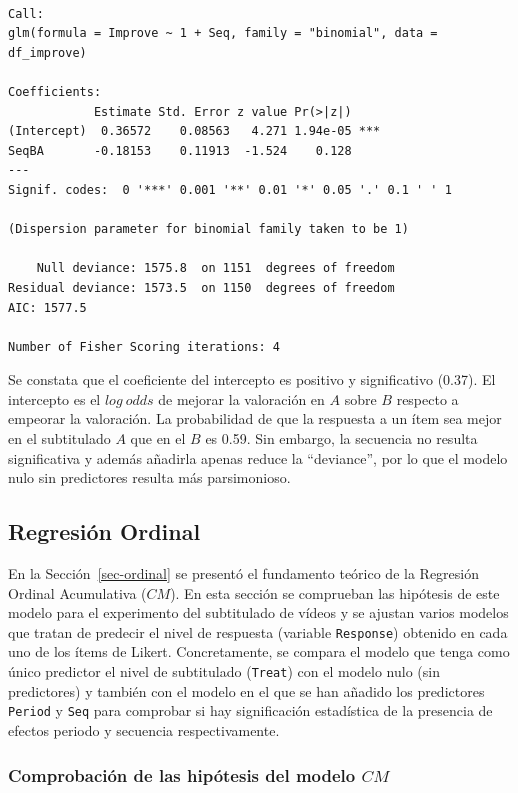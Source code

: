 \documentclass[
  12pt,
  a4paper,
  extrafontsizes,
  onecolumn,
  openright,
  table]{memoir}
\begin{document}
\begin{verbatim}

Call:
glm(formula = Improve ~ 1 + Seq, family = "binomial", data = df_improve)

Coefficients:
            Estimate Std. Error z value Pr(>|z|)    
(Intercept)  0.36572    0.08563   4.271 1.94e-05 ***
SeqBA       -0.18153    0.11913  -1.524    0.128    
---
Signif. codes:  0 '***' 0.001 '**' 0.01 '*' 0.05 '.' 0.1 ' ' 1

(Dispersion parameter for binomial family taken to be 1)

    Null deviance: 1575.8  on 1151  degrees of freedom
Residual deviance: 1573.5  on 1150  degrees of freedom
AIC: 1577.5

Number of Fisher Scoring iterations: 4
\end{verbatim}

\normalsize

Se constata que el coeficiente del intercepto es positivo y
significativo (0.37). El intercepto es el \(log\ odds\) de mejorar la
valoración en \(A\) sobre \(B\) respecto a empeorar la valoración. La
probabilidad de que la respuesta a un ítem sea mejor en el subtitulado
\(A\) que en el \(B\) es 0.59. Sin embargo, la secuencia no resulta
significativa y además añadirla apenas reduce la \enquote{deviance}, por
lo que el modelo nulo sin predictores resulta más parsimonioso.

\hypertarget{sec-ordinal-2}{%
\subsection{Regresión Ordinal}\label{sec-ordinal-2}}

En la Sección~\ref{sec-ordinal} se presentó el fundamento teórico de la
Regresión Ordinal Acumulativa (\(CM\)). En esta sección se comprueban
las hipótesis de este modelo para el experimento del subtitulado de
vídeos y se ajustan varios modelos que tratan de predecir el nivel de
respuesta (variable \texttt{Response}) obtenido en cada uno de los ítems
de Likert. Concretamente, se compara el modelo que tenga como único
predictor el nivel de subtitulado (\texttt{Treat}) con el modelo nulo
(sin predictores) y también con el modelo en el que se han añadido los
predictores \texttt{Period} y \texttt{Seq} para comprobar si hay
significación estadística de la presencia de efectos periodo y secuencia
respectivamente.

\hypertarget{comprobaciuxf3n-de-las-hipuxf3tesis-del-modelo-cm}{%
\subsubsection{\texorpdfstring{Comprobación de las hipótesis del modelo
\(CM\)}{Comprobación de las hipótesis del modelo CM}}\label{comprobaciuxf3n-de-las-hipuxf3tesis-del-modelo-cm}}
\end{document}
